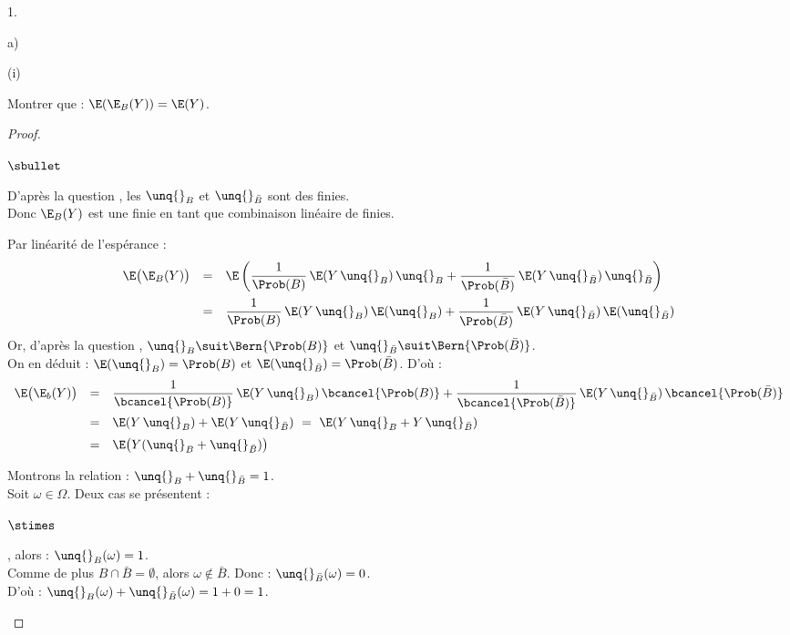 \documentclass[11pt]{article}%
\begin{document}
\begin{noliste}{1.}
\begin{noliste}{a)}
\begin{nonoliste}{(i)}
      
      \item Montrer que : $\E(\E_B(Y)) = \E(Y)$.
      
      \begin{proof}~
        \begin{noliste}{$\sbullet$}
	  \item D'après la question , les \var $\unq{}_B$
	  et $\unq{}_{\bar{B}}$ sont des \var finies.\\
	  Donc $\E_B(Y)$ est une \var finie en tant que combinaison 
	  linéaire de \var finies.
	  
	  \item Par linéarité de l'espérance :
	  \[
	    \begin{array}{rcl}
	      \E\big(\E_B(Y)\big) &=& \E\left( \dfrac{1}{\Prob(B)}
	      \, \E(Y \, \unq{}_B) \, \unq{}_B + 
	      \dfrac{1}{\Prob(\bar{B})} \, \E(Y \, \unq{}_{\bar{B}})
	      \, \unq{}_{\bar{B}}\right)
	      \\[.4cm]
	      &=& \dfrac{1}{\Prob(B)} \, \E(Y \, \unq{}_B) \, 
	      \E(\unq{}_B) + \dfrac{1}{\Prob(\bar{B})} \, \E(Y \,
	      \unq{}_{\bar{B}}) \, \E(\unq{}_{\bar{B}})
	    \end{array}
	  \]
	  Or, d'après la question , $\unq{}_B \suit
	  \Bern{\Prob(B)}$ et $\unq{}_{\bar{B}} \suit \Bern{\Prob(
	  \bar{B})}$.\\
	  On en déduit : $\E(\unq{}_B) = \Prob(B)$ et $\E(\unq{}_{
	  \bar{B}}) = \Prob(\bar{B})$. D'où :
	  \[
	    \begin{array}{rcl}
	      \E\big(\E_b(Y)\big) &=& \dfrac{1}{\bcancel{\Prob(B)}}
	      \, \E(Y \, \unq{}_B) \, \bcancel{\Prob(B)} + 
	      \dfrac{1}{\bcancel{\Prob(\bar{B})}} \, \E(Y \,
	      \unq{}_{\bar{B}}) \, \bcancel{\Prob(\bar{B})}
	      \\[.4cm]
	      &=& \E(Y \, \unq{}_B) + \E(Y \, \unq{}_{\bar{B}})
	      \ = \ \E(Y \, \unq{}_B + Y \, \unq{}_{\bar{B}})
	      \\[.2cm]
	      &=& \E\big(Y(\unq{}_B + \unq{}_{\bar{B}})\big)
	    \end{array}
	  \]
	  
	  \item Montrons la relation : $\unq{}_B + \unq{}_{\bar{B}}
	  =1$.\\
	  Soit $\omega \in \Omega$. Deux cas se présentent :
	  \end{noliste}
	  \begin{liste}{$\stimes$}
	    \item {}, alors : $\unq{}_B
	    (\omega)=1$.\\
	    Comme de plus $B \cap \bar{B} = \emptyset$, alors 
	    $\omega \notin \bar{B}$. Donc : $\unq{}_{\bar{B}}
	    (\omega)=0$.\\
	    D'où : $\unq{}_B(\omega) + \unq{}_{\bar{B}}(\omega) =
	    1+0=1$.
	    

\end{liste}
\end{proof}
\end{nonoliste}
\end{noliste}
\end{noliste}
\end{document}
